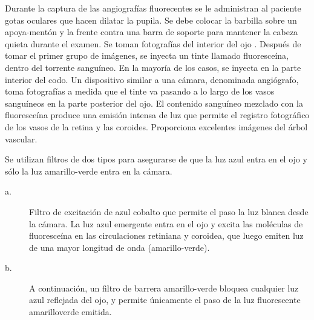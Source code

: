 Durante la captura de las angiograf\'ias fluorecentes se le administran al paciente gotas oculares que hacen dilatar la pupila. Se debe colocar la barbilla sobre un apoya-ment\'on y la frente contra una barra de soporte para mantener la cabeza quieta durante el examen. Se toman fotograf\'ias del interior del ojo . Despu\'es de tomar el primer grupo de im\'agenes, se inyecta un tinte llamado fluoresce\'ina, dentro del  torrente sangu\'ineo. En la mayor\'ia de los casos, se inyecta en la parte interior del codo. Un dispositivo similar a una c\'amara, denominada angi\'ografo, toma fotograf\'ias a medida que el tinte va pasando a lo largo de los vasos sangu\'ineos en la parte posterior del ojo. El contenido sangu\'ineo mezclado con la fluoresce\'ina produce una emisi\'on intensa de luz que permite el registro fotogr\'afico de los vasos de la retina y las coroides. Proporciona excelentes im\'agenes del \'arbol vascular.


Se utilizan filtros de dos tipos para asegurarse de que la luz azul entra en el ojo y s\'olo la luz amarillo-verde entra en la c\'amara.

\begin{description}
  \item[a.] 
 Filtro de excitación de azul cobalto que permite el paso la luz blanca desde la cámara. La luz azul emergente
entra en el ojo y excita las moléculas de fluoresceína en las circulaciones retiniana y coroidea, que luego emiten
luz de una mayor longitud de onda (amarillo-verde).
\item[b.] A continuación, un filtro de barrera amarillo-verde bloquea cualquier luz azul reflejada del ojo, y permite
únicamente el paso de la luz fluorescente amarilloverde emitida.\cite{kanski2012oftalmologia}
\end{description}






